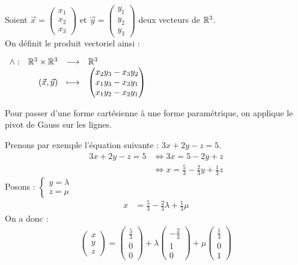 \begin{definition}
	Soient $\vec{x} = \begin{pmatrix} x_1 \\ x_2 \\ x_3 \end{pmatrix}$ et $\vec{y} = \begin{pmatrix} y_1 \\ y_2 \\ y_3 \end{pmatrix}$ deux vecteurs de $\mathbb{R}^3$.
	\\
	On définit le produit vectoriel ainsi :
	\begin{center}
		$
		\begin{array}{rrcl} \wedge : & \mathbb{R}^3 \times \mathbb{R}^3 & \longrightarrow & \mathbb{R}^3 \\ & (\vec{x}, \vec{y}) & \longmapsto & 
		\begin{pmatrix}
			x_2 y_3 - x_3 y_2 \\
			x_1 y_3 - x_3 y_1 \\
			x_1 y_2 - x_2 y_1
		\end{pmatrix}
		 \end{array}
		$
	\end{center}
\end{definition}

Pour passer d'une forme cartésienne à une forme paramétrique, on applique le pivot de Gauss sur les lignes.

\begin{example}
	Prenons par exemple l'équation suivante : $3x + 2y - z = 5$.
	\begin{align*}
		3x + 2y - z = 5 &\iff 3x = 5 - 2y + z \\
		&\iff x = \frac{5}{3} - \frac{2}{3}y + \frac{1}{3} z 
	\end{align*}
	Posons : 
	$
	\begin{cases}
		y = \lambda \\
		z = \mu 
	\end{cases}
	$
	\begin{align*}
		x &= \frac{5}{3} - \frac{2}{3} \lambda + \frac{1}{3} \mu
	\end{align*}
	On a donc :
	\begin{align*}
		\begin{pmatrix}
			x \\
			y \\
			z
		\end{pmatrix}
		= 
		\begin{pmatrix}
			\frac{5}{3} \\ 
			0 \\
			0
		\end{pmatrix}
		+ \lambda 
		\begin{pmatrix}
			-\frac{2}{3} \\
			1 \\
			0
		\end{pmatrix}
		+ \mu
		\begin{pmatrix}
			\frac{1}{3} \\
			0 \\
			1
		\end{pmatrix}
	\end{align*}
\end{example}
